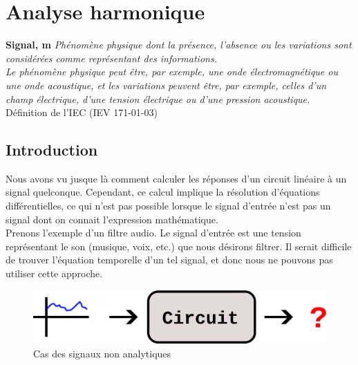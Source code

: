 \chapter{Analyse harmonique}

\begin{minipage}{0.8\textwidth}
	\textbf{Signal, m} \textit{Phénomène physique dont la présence, l'absence ou les variations sont considérées comme représentant des informations.}\\

	\textit{Le phénomène physique peut être, par exemple, une onde électromagnétique ou une onde acoustique, et les variations peuvent être, par exemple, celles d’un champ électrique, d’une tension électrique ou d’une pression acoustique.} \\ 

	\hspace*{0pt}\hfill Définition de l'IEC (IEV 171-01-03)
\end{minipage}

\section{Introduction}

Nous avons vu jusque là comment calculer les réponses d'un circuit linéaire à un signal quelconque. Cependant, ce calcul implique la résolution d'équations différentielles, ce qui n'est pas possible lorsque le signal d'entrée n'est pas un signal dont on connait l'expression mathématique. \\

Prenons l'exemple d'un filtre audio. Le signal d'entrée est une tension représentant le son (musique, voix, etc.) que nous désirons filtrer. Il serait difficile de trouver l'équation temporelle d'un tel signal, et donc nous ne pouvons pas utiliser cette approche. \\

\begin{figure}[!h]
\begin{center}
\includegraphics{part01/chap06/intro01.png}
\end{center}
	\caption{ Cas des signaux non analytiques}
\end{figure}

